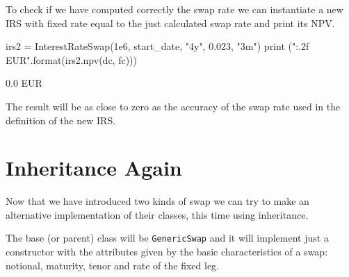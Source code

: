 To check if we have computed correctly the swap rate we can instantiate a new IRS with fixed rate equal to the just calculated swap rate and print its NPV.

\begin{ipython}
irs2 = InterestRateSwap(1e6, start_date, "4y", 0.023, "3m")
print ("{:.2f} EUR".format(irs2.npv(dc, fc)))
\end{ipython}
\begin{ioutput}
0.0 EUR
\end{ioutput}
\noindent
The result will be as close to zero as the accuracy of the swap rate used in the definition of the new IRS.
   
\section{Inheritance Again}
\begin{finmarkets}
Now that we have introduced two kinds of swap we can try to make an alternative implementation of their classes, this time using inheritance.

The base (or parent) class will be \texttt{GenericSwap} and it will implement just a constructor with the attributes given by the basic characteristics of a swap: notional, maturity, tenor and rate of the fixed leg.
\end{finmarkets}

